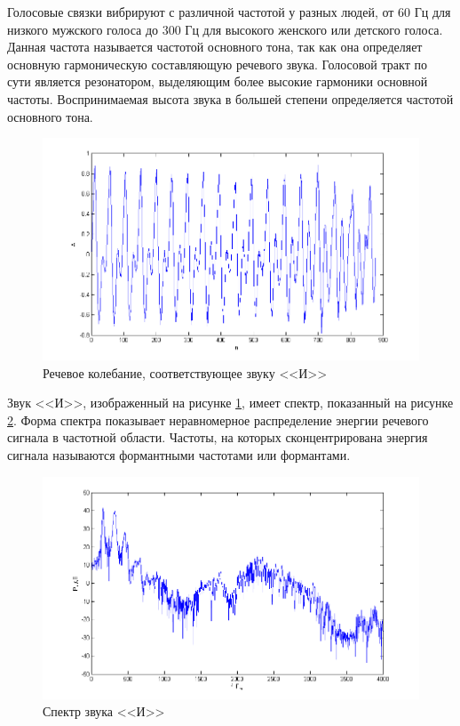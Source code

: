 \documentclass[a4paper,14pt,russian,utf8,nocolumnsxix,nocolumnxxxi,nocolumnxxxii]{eskdtext}
\begin{document}
Голосовые связки вибрируют с различной частотой у разных людей, от 60 Гц для низкого мужского голоса до 300 Гц для высокого женского или детского голоса. Данная частота называется частотой основного тона, так как она определяет основную гармоническую составляющую речевого звука. Голосовой тракт по сути является резонатором, выделяющим более высокие гармоники основной частоты. Воспринимаемая высота звука в большей степени определяется частотой основного тона.

\begin{figure}[h]	
	\centering
	\includegraphics[width=120mm]{i1_form.png}			
	\caption{Речевое колебание, соответствующее звуку <<И>>}
	\label{i1_form}
\end{figure}

Звук <<И>>, изображенный на рисунке \ref{i1_form}, имеет спектр, показанный на рисунке \ref{i1_spect}. Форма спектра показывает неравномерное распределение энергии речевого сигнала в частотной области. Частоты, на которых сконцентрирована энергия сигнала называются формантными частотами или формантами.
\begin{figure}[h]	
	\centering
	\includegraphics[width=120mm]{i1_spect.png}			
	\caption{Спектр звука <<И>>}
	\label{i1_spect}
\end{figure}
\end{document}
